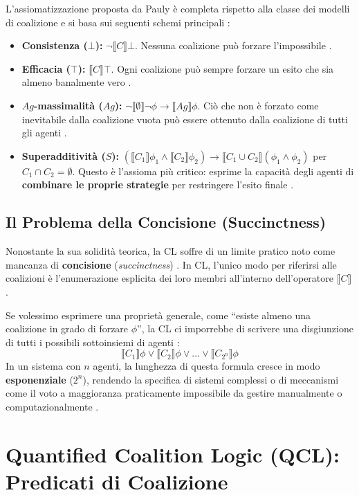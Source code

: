 \documentclass[12pt]{article}
\newcommand{\CL}[1]{\llbracket #1 \rrbracket}
\begin{document}
L'assiomatizzazione proposta da Pauly è completa rispetto alla classe dei
modelli di coalizione e si basa sui seguenti schemi principali :
\begin{itemize}
	\item \textbf{Consistenza ($\bot$):} $\neg \CL{C} \bot$. Nessuna coalizione
	      può forzare l'impossibile .
	\item \textbf{Efficacia ($\top$):} $\CL{C} \top$. Ogni coalizione può
	      sempre forzare un esito che sia almeno banalmente vero .
	\item \textbf{$Ag$-massimalità ($Ag$):} $\neg \CL{\emptyset} \neg \phi \to \CL{Ag} \phi$.
	      Ciò che non è forzato come inevitabile dalla coalizione vuota può essere
	      ottenuto dalla coalizione di tutti gli agenti .
	\item \textbf{Superadditività ($S$):} $(\CL{C_1} \phi_1 \land \CL{C_2} \phi_2)
		      \to \CL{C_1 \cup C_2} (\phi_1 \land \phi_2)$ per $C_1 \cap C_2 = \emptyset$.
	      Questo è l'assioma più critico: esprime la capacità degli agenti di
	      \textbf{combinare le proprie strategie} per restringere l'esito finale
	      .
\end{itemize}

\subsection{Il Problema della Concisione (Succinctness)}

Nonostante la sua solidità teorica, la CL soffre di un limite pratico noto
come mancanza di \textbf{concisione} (\textit{succinctness}) .
In CL, l'unico modo per riferirsi alle coalizioni è l'enumerazione esplicita
dei loro membri all'interno dell'operatore $\CL{C}$.

Se volessimo esprimere una proprietà generale, come ``esiste almeno una
coalizione in grado di forzare $\phi$'', la CL ci imporrebbe di scrivere
una disgiunzione di tutti i possibili sottoinsiemi di agenti :
\begin{equation}
	\CL{C_1} \phi \lor \CL{C_2} \phi \lor \dots \lor \CL{C_{2^n}} \phi
\end{equation}
In un sistema con $n$ agenti, la lunghezza di questa formula cresce in modo
\textbf{esponenziale} ($2^n$), rendendo la specifica di sistemi complessi
o di meccanismi come il voto a maggioranza praticamente impossibile da
gestire manualmente o computazionalmente .

\section{Quantified Coalition Logic (QCL): Predicati di Coalizione}
\end{document}
